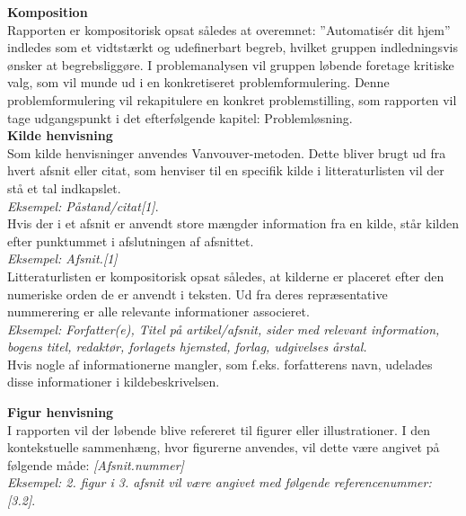 {\bf Komposition} \\
Rapporten er kompositorisk opsat således at overemnet: ”Automatisér dit hjem” indledes som et vidtstærkt og udefinerbart begreb, hvilket gruppen indledningsvis ønsker at begrebsliggøre. I problemanalysen vil gruppen løbende foretage kritiske valg, som vil munde ud i en konkretiseret problemformulering. Denne problemformulering vil rekapitulere en konkret problemstilling, som rapporten vil tage udgangspunkt i det efterfølgende kapitel: Problemløsning. \\

{\bf Kilde henvisning} \\
Som kilde henvisninger anvendes Vanvouver-metoden. Dette bliver brugt ud fra hvert afsnit eller citat, som henviser til en specifik kilde i litteraturlisten vil der stå et tal indkapslet. \\
\textit{Eksempel: Påstand/citat\emph{[1]}}.\\

Hvis der i et afsnit er anvendt store mængder information fra en kilde, står kilden efter punktummet i afslutningen af afsnittet.\\
\textit{Eksempel: Afsnit.\emph{[1]}}\\

Litteraturlisten er kompositorisk opsat således, at kilderne er placeret efter den numeriske orden de er anvendt i teksten. Ud fra deres repræsentative nummerering er alle relevante informationer associeret. \\
\textit{Eksempel: Forfatter(e), Titel på artikel/afsnit, sider med relevant information, bogens titel, redaktør, forlagets hjemsted, forlag, udgivelses årstal.} \\

Hvis nogle af informationerne mangler, som f.eks. forfatterens navn, udelades disse informationer i kildebeskrivelsen. \clearpage

{\bf Figur henvisning} \\
I rapporten vil der løbende blive refereret til figurer eller illustrationer. I den kontekstuelle sammenhæng, hvor figurerne anvendes, vil dette være angivet på følgende måde: \textit{[Afsnit.nummer]} \\

\textit{Eksempel: 2. figur i 3. afsnit vil være angivet med følgende referencenummer: [3.2]}. \\

